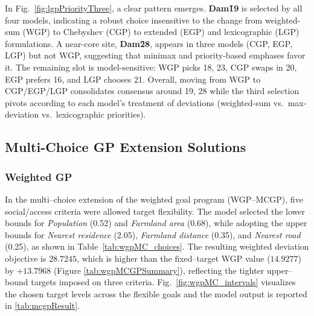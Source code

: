 



In Fig.~\ref{fig:lgpPriorityThree}, a clear pattern emerges. \textbf{Dam\~19} is selected by all four models, indicating a robust choice insensitive to the change from weighted-sum (WGP) to Chebyshev (CGP) to extended (EGP) and lexicographic (LGP) formulations. A near-core site, \textbf{Dam\~28}, appears in three models (CGP, EGP, LGP) but not WGP, suggesting that minimax and priority-based emphases favor it. The remaining slot is model-sensitive: WGP picks {18, 23}, CGP swaps in {20}, EGP prefers {16}, and LGP chooses {21}. Overall, moving from WGP to CGP/EGP/LGP consolidates consensus around {19, 28} while the third selection pivots according to each model’s treatment of deviations (weighted-sum vs.\ max-deviation vs.\ lexicographic priorities).



\subsection{Multi-Choice GP Extension Solutions}



\subsubsection{Weighted GP}
In the multi–choice extension of the weighted goal program (WGP–MCGP), five social/access criteria were allowed target flexibility. The model selected the lower bounds for \emph{Population} (0.52) and \emph{Farmland area} (0.68), while adopting the upper bounds for \emph{Nearest residence} (2.05), \emph{Farmland distance} (0.35), and \emph{Nearest road} (0.25), as shown in Table~\ref{tab:wgpMC_choices}. The resulting weighted deviation objective is $28.7245$, which is higher than the fixed–target WGP value ($14.9277$) by $+13.7968$ (Figure \ref{tab:wgpMCGPSummary}), reflecting the tighter upper–bound targets imposed on three criteria. Fig.~\ref{fig:wgpMC_intervals} visualizes the chosen target levels across the flexible goals and the model output is reported in \ref{tab:mcgpResult}.      






